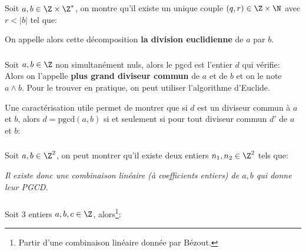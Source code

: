 \chapter*{}

\subsection*{}
Soit \(a, b \in \Z \times \Z^*\), on montre qu'il existe un unique couple \((q, r) \in \Z \times \N\) avec \(r < |b|\) tel que:

On appelle alors cette décomposition \textbf{la division euclidienne} de \(a\) par \(b\).

\subsection*{}

Soit \(a, b \in \Z\) non simultanément nuls, alors le pgcd est l'entier \(d\) qui vérifie:
Alors on l'appelle \textbf{plus grand diviseur commun} de \(a\) et de \(b\) et on le note \(a \wedge b\). Pour le trouver en pratique, on peut utiliser l'algorithme d'Euclide. \<

Une caractérisation utile permet de montrer que si \(d\) est un diviseur commun à \(a\) et \(b\), alors \(d = \text{pgcd}(a , b)\) si et seulement si pour tout diviseur commun \(d'\) de \(a\) et \(b\):

\subsection*{}
Soit \(a, b\in \Z^2\), on peut montrer qu'il existe deux entiers \(n_1, n_2 \in \Z^2\) tels que:
\begin{center}
   \textit{
       Il existe donc une combinaison linéaire (à coefficients entiers) de \(a, b\) qui donne leur PGCD.
   }
\end{center}

\subsection*{}
Soit 3 entiers \(a, b, c \in \Z\), alors\footnote[1]{Partir d'une combinaison linéaire donnée par Bézout.}:
